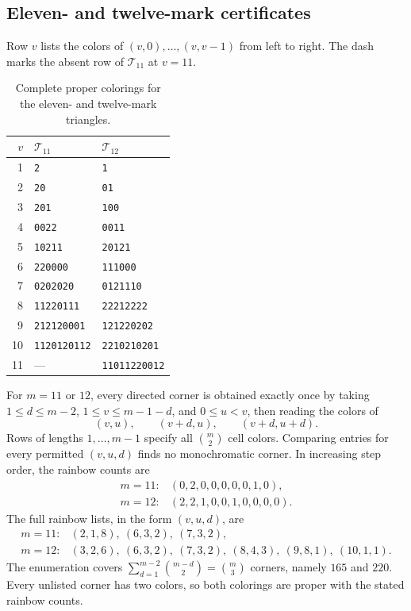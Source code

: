 \documentclass[11pt,a4paper]{article}
\newif\ifshowrevisions
\newcommand{\rev}[1]{{\ifshowrevisions\color{red}\fi #1}}
\theoremstyle{definition}
\newcommand{\Ttri}{\mathcal T}
\numberwithin{equation}{section}
\begin{document}
\subsection{\rev{Eleven- and twelve-mark certificates}}\label{app:local-rainbow-certificates}
	Row $v$ lists the colors of $(v,0),\ldots,(v,v-1)$ from left to right. The dash marks the absent row of $\Ttri_{11}$ at $v=11$.
	\begin{table}[!htbp]\centering\caption{Complete proper colorings for the eleven- and twelve-mark triangles.}\label{tab:local-rainbows}
		\begin{tabular}{@{}rll@{}}
			\toprule
			$v$ & $\Ttri_{11}$ & $\Ttri_{12}$\\\midrule
			1 & \texttt{2} & \texttt{1}\\
			2 & \texttt{20} & \texttt{01}\\
			3 & \texttt{201} & \texttt{100}\\
			4 & \texttt{0022} & \texttt{0011}\\
			5 & \texttt{10211} & \texttt{20121}\\
			6 & \texttt{220000} & \texttt{111000}\\
			7 & \texttt{0202020} & \texttt{0121110}\\
			8 & \texttt{11220111} & \texttt{22212222}\\
			9 & \texttt{212120001} & \texttt{121220202}\\
			10 & \texttt{1120120112} & \texttt{2210210201}\\
			11 & --- & \texttt{11011220012}\\
			\bottomrule
		\end{tabular}
	\end{table}
	For $m=11$ or $12$, every directed corner is obtained exactly once by taking $1\le d\le m-2$, $1\le v\le m-1-d$, and $0\le u<v$, then reading the colors of
	\[
	(v,u),\qquad(v+d,u),\qquad(v+d,u+d).
	\]
	Rows of lengths $1,\ldots,m-1$ specify all $\binom m2$ cell colors. Comparing entries for every permitted $(v,u,d)$ finds no monochromatic corner. In increasing step order, the rainbow counts are
	\[
	\begin{array}{ll}
		m=11:&(0,2,0,0,0,0,0,1,0),\\
		m=12:&(2,2,1,0,0,1,0,0,0,0).
	\end{array}
	\]
	The full rainbow lists, in the form $(v,u,d)$, are
	\[
	\begin{array}{ll}
		m=11:&(2,1,8),\ (6,3,2),\ (7,3,2),\\
		m=12:&(3,2,6),\ (6,3,2),\ (7,3,2),\ (8,4,3),\ (9,8,1),\ (10,1,1).
	\end{array}
	\]
	The enumeration covers $\sum_{d=1}^{m-2}\binom{m-d}{2}=\binom m3$ corners, namely $165$ and $220$. Every unlisted corner has two colors, so both colorings are proper with the stated rainbow counts.
\end{document}
